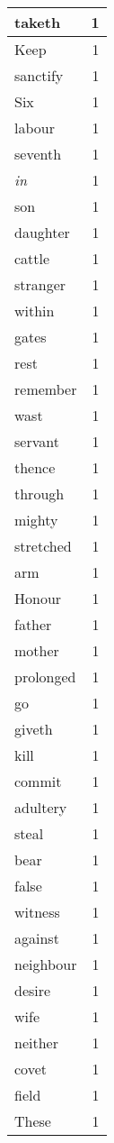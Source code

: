 \begin{center}
\begin{longtable}{l|r}
taketh & 1 \\ \hline
Keep & 1 \\ \hline
sanctify & 1 \\ \hline
Six & 1 \\ \hline
labour & 1 \\ \hline
seventh & 1 \\ \hline
\emph{in} & 1 \\ \hline
son & 1 \\ \hline
daughter & 1 \\ \hline
cattle & 1 \\ \hline
stranger & 1 \\ \hline
within & 1 \\ \hline
gates & 1 \\ \hline
rest & 1 \\ \hline
remember & 1 \\ \hline
wast & 1 \\ \hline
servant & 1 \\ \hline
thence & 1 \\ \hline
through & 1 \\ \hline
mighty & 1 \\ \hline
stretched & 1 \\ \hline
arm & 1 \\ \hline
Honour & 1 \\ \hline
father & 1 \\ \hline
mother & 1 \\ \hline
prolonged & 1 \\ \hline
go & 1 \\ \hline
giveth & 1 \\ \hline
kill & 1 \\ \hline
commit & 1 \\ \hline
adultery & 1 \\ \hline
steal & 1 \\ \hline
bear & 1 \\ \hline
false & 1 \\ \hline
witness & 1 \\ \hline
against & 1 \\ \hline
neighbour & 1 \\ \hline
desire & 1 \\ \hline
wife & 1 \\ \hline
neither & 1 \\ \hline
covet & 1 \\ \hline
field & 1 \\ \hline
These & 1 \\ \hline

\end{longtable}
\end{center}
